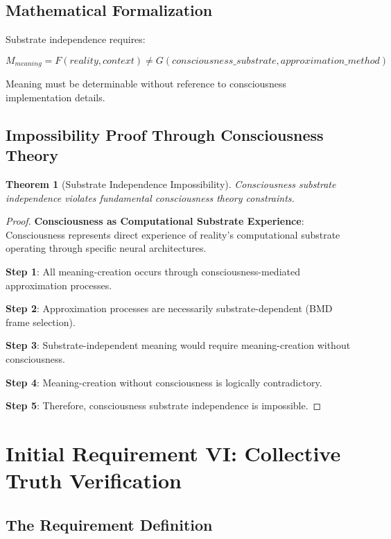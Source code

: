 \documentclass[12pt,a4paper]{article}
\newtheorem{theorem}{Theorem}[section]
\begin{document}
\subsection{Mathematical Formalization}

Substrate independence requires:

$$M_{meaning} = F(reality, context) \neq G(consciousness\_substrate, approximation\_method)$$

Meaning must be determinable without reference to consciousness implementation details.

\subsection{Impossibility Proof Through Consciousness Theory}

\begin{theorem}[Substrate Independence Impossibility]
Consciousness substrate independence violates fundamental consciousness theory constraints.
\end{theorem}

\begin{proof}
\textbf{Consciousness as Computational Substrate Experience}: Consciousness represents direct experience of reality's computational substrate operating through specific neural architectures.

\textbf{Step 1}: All meaning-creation occurs through consciousness-mediated approximation processes.

\textbf{Step 2}: Approximation processes are necessarily substrate-dependent (BMD frame selection).

\textbf{Step 3}: Substrate-independent meaning would require meaning-creation without consciousness.

\textbf{Step 4}: Meaning-creation without consciousness is logically contradictory.

\textbf{Step 5}: Therefore, consciousness substrate independence is impossible.
\end{proof}

\section{Initial Requirement VI: Collective Truth Verification}

\subsection{The Requirement Definition}
\end{document}
